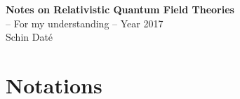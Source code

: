 \documentclass{jarticle}
\newcommand{\mainsrcdirectory}[0]{../src}
\newcounter{problem}
\begin{document}
\begin{titlepage} 
\vspace*{3cm}
\vspace*{2cm}
\noindent
\begin{center}
{\Huge \bf Notes on Relativistic Quantum Field Theories}   \\
-- For my understanding --
\vspace{1cm}
{\large Year 2017}
\vspace{1cm}
\\
{\Large 
Schin Dat\'e}
\end{center}
\end{titlepage} 

\setcounter{section}{-1}
\setcounter{page}{0}

\tableofcontents   

\setcounter{footnote}{0}
\setcounter{equation}{0}
\setcounter{figure}{0}
\setcounter{problem}{0}

\newpage %


\vspace*{-18mm}
\setcounter{section}{-1}
\setcounter{page}{1}
\section{Notations}

\end{document}
